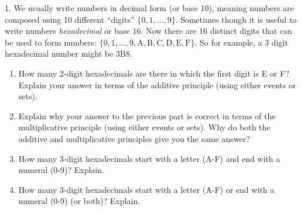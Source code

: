 \documentclass[10pt,]{book}
\theoremstyle{plain}
\theoremstyle{definition}
\theoremstyle{definition}
\theoremstyle{definition}
\numberwithin{equation}{chapter}
\begin{document}
\begin{exerciselist}
\item[1.]\hypertarget{exercise-124}{}
            We usually write numbers in decimal form (or base 10), meaning numbers are composed using 10 different ``digits'' \(\{0,1,\ldots, 9\}\). Sometimes though it is useful to write numbers \emph{hexadecimal} or base 16. Now there are 16 distinct digits that can be used to form numbers: \(\{0, 1, \ldots, 9, \mathrm{A, B, C, D, E, F}\}\). So for example, a 3 digit hexadecimal number might be 3B8.
\leavevmode%
\begin{enumerate}[label=(\alph*)]
\item\hypertarget{li-776}{}
                How many 2-digit hexadecimals are there in which the first digit is E or F? Explain your answer in terms of the additive principle (using either events or sets).


\item\hypertarget{li-777}{}
                Explain why your answer to the previous part is correct in terms of the multiplicative principle (using either events or sets). Why do both the additive and multiplicative principles give you the same answer?


\item\hypertarget{li-778}{}
                How many 3-digit hexadecimals start with a letter (A-F) and end with a numeral (0-9)? Explain.


\item\hypertarget{li-779}{}
                How many 3-digit hexadecimals start with a letter (A-F) or end with a numeral (0-9) (or both)? Explain.



\end{enumerate}
\end{exerciselist}
\end{document}
